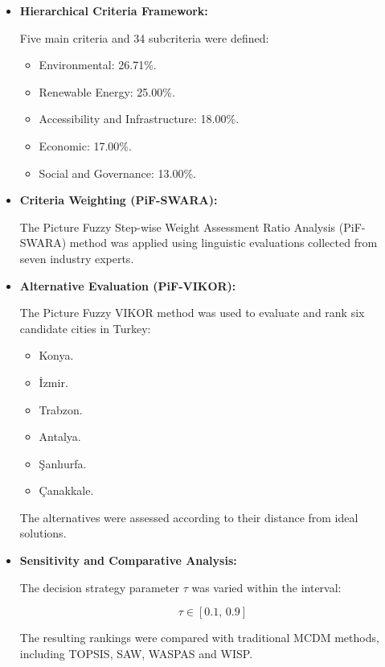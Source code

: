 \begin{itemize}

    \item \textbf{Hierarchical Criteria Framework:}

    Five main criteria and 34 subcriteria were defined:

    \begin{itemize}
        \item Environmental: 26.71\%.
        \item Renewable Energy: 25.00\%.
        \item Accessibility and Infrastructure: 18.00\%.
        \item Economic: 17.00\%.
        \item Social and Governance: 13.00\%.
    \end{itemize}

    \item \textbf{Criteria Weighting (PiF-SWARA):}

    The Picture Fuzzy Step-wise Weight Assessment Ratio Analysis (PiF-SWARA) method was applied using linguistic evaluations collected from seven industry experts.

    \item \textbf{Alternative Evaluation (PiF-VIKOR):}

    The Picture Fuzzy VIKOR method was used to evaluate and rank six candidate cities in Turkey:

    \begin{itemize}
        \item Konya.
        \item İzmir.
        \item Trabzon.
        \item Antalya.
        \item Şanlıurfa.
        \item Çanakkale.
    \end{itemize}

    The alternatives were assessed according to their distance from ideal solutions.

    \item \textbf{Sensitivity and Comparative Analysis:}

    The decision strategy parameter $\tau$ was varied within the interval:

    \[
        \tau \in [0.1,\,0.9]
    \]

    The resulting rankings were compared with traditional MCDM methods, including TOPSIS, SAW, WASPAS and WISP.

\end{itemize}

